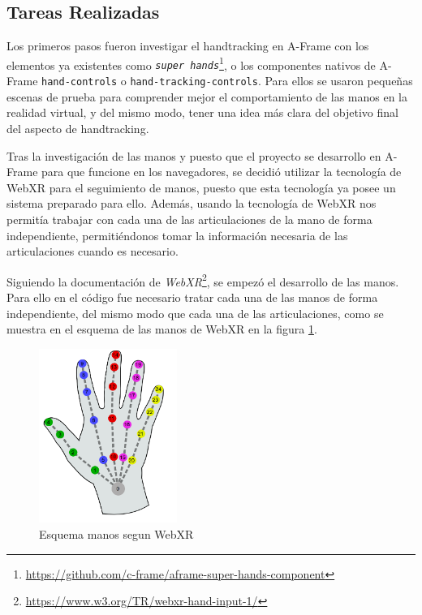 \documentclass[a4paper, 12pt]{book}
\begin{document}
\subsection{Tareas Realizadas}
\label{subsec:implementacion1}
Los primeros pasos fueron investigar el handtracking en A-Frame con los elementos ya existentes como \textit{\texttt{super hands}}\footnote{\url{https://github.com/c-frame/aframe-super-hands-component}}, o los componentes nativos de A-Frame \texttt{hand-controls} o \texttt{hand-tracking-controls}.
Para ellos se usaron pequeñas escenas de prueba para comprender mejor el comportamiento de las manos en la realidad virtual, y del mismo modo, tener una idea más clara del objetivo final del aspecto de handtracking. 

Tras la investigación de las manos y puesto que el proyecto se desarrollo en A-Frame para que funcione en los navegadores, se decidió utilizar la tecnología de WebXR para el seguimiento de manos, puesto que esta tecnología ya posee un sistema preparado para ello. Además, usando la tecnología de WebXR nos permitía trabajar con cada una de las articulaciones de la mano de forma independiente, permitiéndonos tomar la información necesaria de las articulaciones cuando es necesario. 

Siguiendo la documentación de \textit{WebXR}\footnote{\url{https://www.w3.org/TR/webxr-hand-input-1/}}, se empezó el desarrollo de las manos. Para ello en el código fue necesario tratar cada una de las manos de forma independiente, del mismo modo que cada una de las articulaciones, como se muestra en el esquema de las manos de WebXR en la figura \ref{fig:WebXR-manos}. 

\begin{figure}[H] 
  \centering
  \includegraphics[width=0.4\textwidth]{img/webxr-mano.png} 
  \caption{Esquema manos segun WebXR}
  \label{fig:WebXR-manos}
\end{figure}
\end{document}
